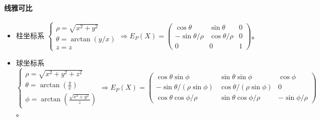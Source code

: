 \documentclass[
12pt, %
a4paper, 
oneside, %
headinclude,footinclude, %
]{scrartcl}
\begin{document}
\paragraph{线雅可比}
\begin{itemize}
\item 柱坐标系
$
\begin{cases}
\rho = \sqrt{x^2 + y^2} \\
\theta = \arctan(y / x) \\
z = z
\end{cases}
\Rightarrow
E_P(X) = \begin{pmatrix} \cos\theta & \sin\theta & 0 \\ -\sin\theta / \rho & \cos\theta / \rho & 0 \\ 0 & 0 & 1 \end{pmatrix}
$。
\item 球坐标系
$
\begin{cases}
\rho = \sqrt{x^2 + y^2 + z^2} \\
\theta = \arctan(\frac{y}{x}) \\
\phi = \arctan(\frac{\sqrt{x^2 + y^2}}{z})
\end{cases}
\Rightarrow
E_P(X) = \begin{pmatrix} \cos\theta \sin\phi & \sin\theta \sin\phi & \cos\phi \\ -\sin\theta / (\rho \sin\phi) & \cos\theta / (\rho \sin\phi) & 0 \\ \cos\theta \cos\phi / \rho & \sin\theta \cos\phi / \rho & -\sin\phi / \rho \end{pmatrix}
$。
\end{itemize} 
\end{document}
